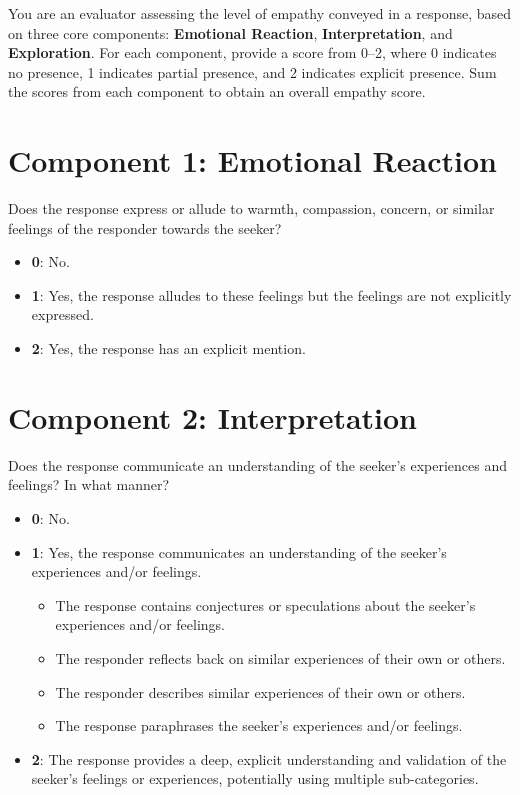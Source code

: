 \begin{tcolorbox}[title=Empathy Assessment, myboxstyle, breakable]
You are an evaluator assessing the level of empathy conveyed in a response, based on three core components: \textbf{Emotional Reaction}, \textbf{Interpretation}, and \textbf{Exploration}. For each component, provide a score from 0–2, where 0 indicates no presence, 1 indicates partial presence, and 2 indicates explicit presence. Sum the scores from each component to obtain an overall empathy score.

\section*{Component 1: Emotional Reaction}
Does the response express or allude to warmth, compassion, concern, or similar feelings of the responder towards the seeker?
\begin{itemize}
    \item \textbf{0}: No.
    \item \textbf{1}: Yes, the response alludes to these feelings but the feelings are not explicitly expressed.
    \item \textbf{2}: Yes, the response has an explicit mention.
\end{itemize}

\section*{Component 2: Interpretation}
Does the response communicate an understanding of the seeker’s experiences and feelings? In what manner?
\begin{itemize}
    \item \textbf{0}: No.
    \item \textbf{1}: Yes, the response communicates an understanding of the seeker’s experiences and/or feelings.
    \begin{itemize}
        \item The response contains conjectures or speculations about the seeker’s experiences and/or feelings.
        \item The responder reflects back on similar experiences of their own or others.
        \item The responder describes similar experiences of their own or others.
        \item The response paraphrases the seeker’s experiences and/or feelings.
    \end{itemize}
    \item \textbf{2}: The response provides a deep, explicit understanding and validation of the seeker’s feelings or experiences, potentially using multiple sub-categories.
\end{itemize}


\end{tcolorbox}
